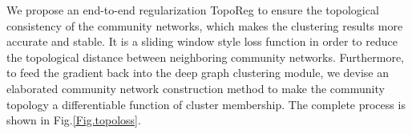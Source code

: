 \documentclass[letterpaper]{article} %
\begin{document}
We propose an end-to-end regularization TopoReg to ensure the topological consistency of the community networks, which makes the clustering results more accurate and stable. %
It is a sliding window style loss function in order to reduce the topological distance between neighboring community networks. Furthermore, to feed the gradient back into the deep graph clustering module, we devise an elaborated community network construction method to make the community topology a differentiable function of cluster membership. The complete process is shown in Fig.\ref{Fig.topoloss}.
\end{document}
